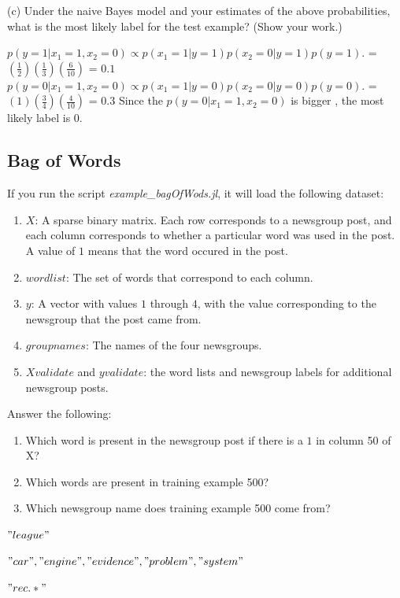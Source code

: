 \documentclass{article}
\def\blu#1{{\color{blu}#1}}
\def\red#1{{\color{red}#1}}
\def\enum#1{\begin{enumerate}#1\end{enumerate}}
\begin{document}
\blu{(c) Under the naive Bayes model and your estimates of the above probabilities, what is the most likely label for the test example? (Show your work.)}



$p( y = 1 |  x_1 = 1 , x_2 = 0 ) \propto p(  x_1 = 1  | y = 1 ) p(  x_2 = 0  | y = 1 ) p( y =1)$.
        \newline =$ (\frac{1}{2}) (\frac{1}{3})(\frac{6}{10}) $
               \newline = $0.1$
\newline  
$p( y = 0 |  x_1 = 1 , x_2 = 0 ) \propto p(  x_1 = 1  | y = 0 ) p(  x_2 = 0  | y = 0 ) p( y =0)$.
        \newline =$ (1) (\frac{3}{4})(\frac{4}{10}) $
               \newline = $0.3$
\newline 
Since the $p( y = 0 |  x_1 = 1 , x_2 = 0 ) $ is bigger , the most likely label is 0.


\subsection{Bag of Words}

If you run the script \emph{example\_bagOfWods.jl}, it will load the following dataset:
\enum{
\item $X$: A sparse binary matrix. Each row corresponds to a newsgroup post, and each column corresponds to whether a particular word was used in the post. A value of $1$ means that the word occured in the post.
\item $wordlist$: The set of words that correspond to each column.
\item $y$: A vector with values $1$ through $4$, with the value corresponding to the newsgroup that the post came from.
\item $groupnames$: The names of the four newsgroups.
\item $Xvalidate$ and $yvalidate$: the word lists and newsgroup labels for additional newsgroup posts.
}
\blu{Answer the following}:
\enum{
\item Which word is present in the newsgroup post if there is a $1$ in column 50 of X?
\item Which words are present in training example 500?
\item Which newsgroup name does training example 500 come from?
}

\begin{enumerate}
\red{
\item  $"league"$
\item  $"car", "engine", "evidence", "problem", "system"$
\item $"rec.*"$
}

\end{enumerate}
\end{document}
